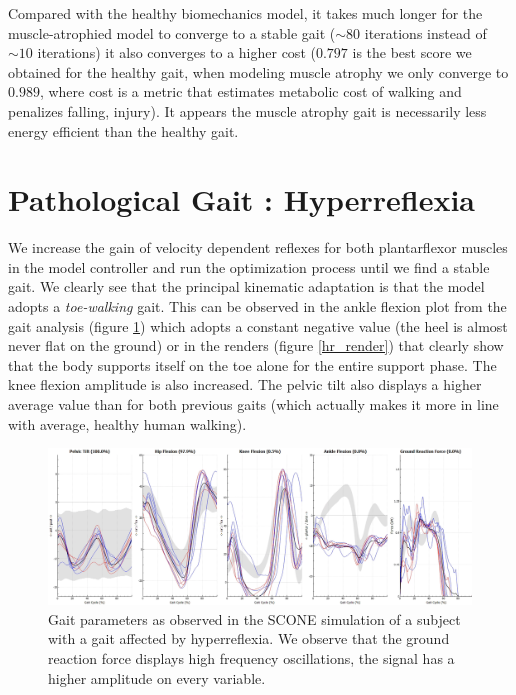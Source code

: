 \documentclass[11pt]{article}
\begin{document}
Compared with the healthy biomechanics model, it takes much longer for the muscle-atrophied model to converge to a stable gait ($\sim 80$ iterations instead of $\sim 10$ iterations) it also converges to a higher cost ($0.797$ is the best score we obtained for the healthy gait, when modeling muscle atrophy we only converge to $0.989$, where cost is a metric that estimates metabolic cost of walking and penalizes falling, injury). It appears the muscle atrophy gait is necessarily less energy efficient than the healthy gait.

\section{Pathological Gait : Hyperreflexia}

We increase the gain of velocity dependent reflexes for both plantarflexor muscles in the model controller and run the optimization process until we find a stable gait. We clearly see that the principal kinematic adaptation is that the model adopts a \textit{toe-walking} gait. This can be observed in the ankle flexion plot  from the gait analysis (figure \ref{hr_gait}) which adopts a constant negative value (the heel is almost never flat on the ground) or in the renders (figure \ref{hr_render}) that clearly show that the body supports itself on the toe alone for the entire support phase. The knee flexion amplitude is also increased. The pelvic tilt also displays a higher average value than for both previous gaits (which actually makes it more in line with average, healthy human walking).

\begin{figure}[h!]
    \centering
    \includegraphics[width=\textwidth]{screens/hyperreflexia_gait.png}
    \caption{Gait parameters as observed in the SCONE simulation of a subject with a gait affected by hyperreflexia. We observe that the ground reaction force displays high frequency oscillations, the signal has a higher amplitude on every variable. }
    \label{hr_gait}
\end{figure}
\end{document}

